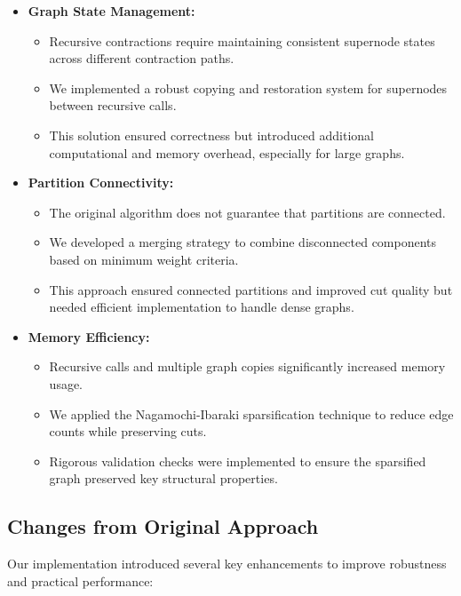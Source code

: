 \documentclass[11pt]{article}
\begin{document}
\begin{itemize}
    \item \textbf{Graph State Management:}
    \begin{itemize}
        \item Recursive contractions require maintaining consistent supernode states across different contraction paths.
        \item We implemented a robust copying and restoration system for supernodes between recursive calls.
        \item This solution ensured correctness but introduced additional computational and memory overhead, especially for large graphs.
    \end{itemize}

    \item \textbf{Partition Connectivity:}
    \begin{itemize}
        \item The original algorithm does not guarantee that partitions are connected.
        \item We developed a merging strategy to combine disconnected components based on minimum weight criteria.
        \item This approach ensured connected partitions and improved cut quality but needed efficient implementation to handle dense graphs.
    \end{itemize}

    \item \textbf{Memory Efficiency:}
    \begin{itemize}
        \item Recursive calls and multiple graph copies significantly increased memory usage.
        \item We applied the Nagamochi-Ibaraki sparsification technique to reduce edge counts while preserving cuts.
        \item Rigorous validation checks were implemented to ensure the sparsified graph preserved key structural properties.
    \end{itemize}
\end{itemize}

\subsection{Changes from Original Approach}

Our implementation introduced several key enhancements to improve robustness and practical performance:
\end{document}
